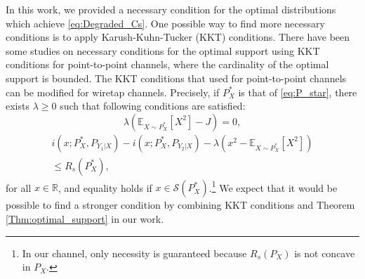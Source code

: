 \documentclass[journal]{IEEEtran}
\begin{document}
In this work, we provided a necessary condition for the optimal distributions which achieve \eqref{eq:Degraded_Cs}. One possible way to find more necessary conditions is to apply Karush-Kuhn-Tucker (KKT) conditions.
There have been some studies on necessary conditions for the optimal support using KKT conditions \cite{p2pADC,SMITH1971203,dytsodiscrete} for point-to-point channels, where the cardinality of the optimal support is bounded.
 The KKT conditions that used for point-to-point channels \cite[Theorem 10]{dytsodiscrete} can be modified for wiretap channels. Precisely, if $P_X^*$ is that of \eqref{eq:P_star}, there exists $\lambda \geq 0$ such that following conditions are satisfied:
\begin{equation}
    \lambda(\mathbb{E}_{X\sim P_X^*}[X^2]-J)=0,
\end{equation}
\begin{multline}
    i(x;P_X^*,P_{Y_1|X})-i(x;P_X^*,P_{Y_2|X})-\lambda (x^2-\mathbb{E}_{X\sim P_X^*}[X^2])
    \\ \leq R_s(P_X^*),
\end{multline}
for all $x \in \mathbb{R}$, and equality holds if $x \in \mathcal{S}(P_X^*)$.\footnote{In our channel, only necessity is guaranteed because $R_s(P_X)$ is not concave in $P_X$.}
We expect that it would be possible to find a stronger condition by combining KKT conditions and Theorem \ref{Thm:optimal_support} in our work.
\end{document}
